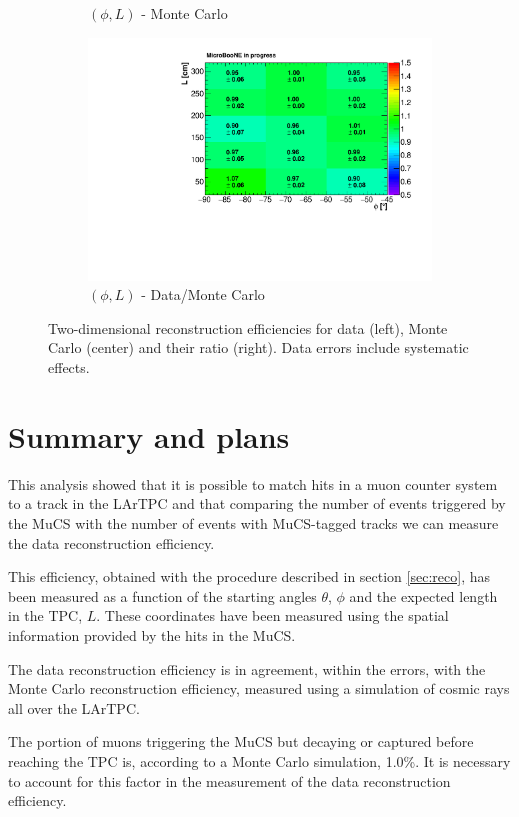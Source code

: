 \documentclass[a4paper]{scrartcl}
\begin{document}
\begin{figure}[htbp]
\begin{subfigure}{0.33\textwidth}
\caption{$(\phi,L)$ - Monte Carlo}
\end{subfigure}\begin{subfigure}{0.33\textwidth}
\includegraphics[width=\linewidth]{figures/phi_l.pdf}
\caption{$(\phi,L)$ - Data/Monte Carlo}
\end{subfigure}
\caption{Two-dimensional reconstruction efficiencies for data (left), Monte Carlo (center) and their ratio (right). Data errors include systematic effects.}\label{fig:2d}
\end{figure}

\section{Summary and plans}
This analysis showed that it is possible to match hits in a muon counter system to a track in the LArTPC and that comparing the number of events triggered by the MuCS with the number of events with MuCS-tagged tracks we can measure the data reconstruction efficiency.

This efficiency, obtained with the procedure described in section \ref{sec:reco}, has been measured as a function of the starting angles $\theta$, $\phi$ and the expected length in the TPC, $L$. These coordinates have been measured using the spatial information provided by the hits in the MuCS.

The data reconstruction efficiency is in agreement, within the errors, with the Monte Carlo reconstruction efficiency, measured using a simulation of cosmic rays all over the LArTPC.

The portion of muons triggering the MuCS but decaying or captured before reaching the TPC is, according to a Monte Carlo simulation, 1.0\%. It is necessary to account for this factor in the measurement of the data reconstruction efficiency.
\end{document}

